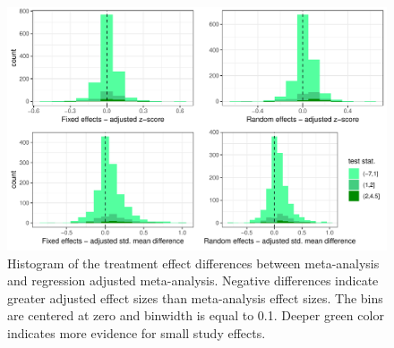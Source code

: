 \documentclass[11pt,a4paper,twoside]{book}\usepackage[]{graphicx}\usepackage[]{color}
\newenvironment{knitrout}{}{} %
\begin{document}
\begin{figure}
\begin{knitrout}
\color{fgcolor}

{\centering \includegraphics[width=\textwidth-3cm]{figure/ch03_figunnamed-chunk-20-1} 

}



\end{knitrout}
\caption{Histogram of the treatment effect differences between meta-analysis and regression adjusted meta-analysis. Negative differences indicate greater adjusted effect sizes than meta-analysis effect sizes. The bins are centered at zero and binwidth is equal to 0.1. Deeper green color indicates more evidence for small study effects.}
\label{fig:adjustment.reg}
\end{figure}
\end{document}
